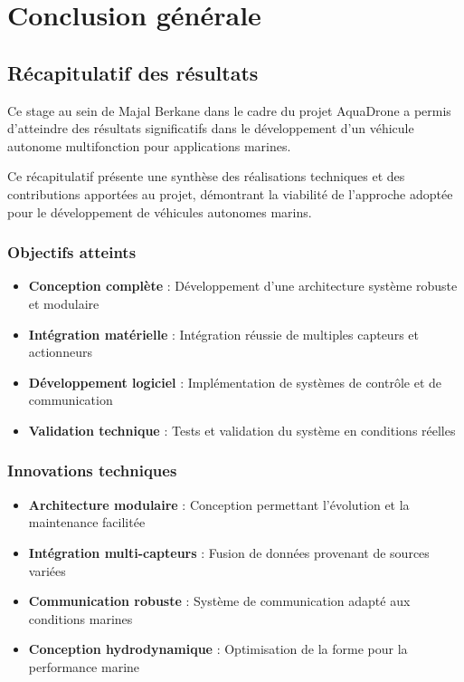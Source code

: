\chapter[Conclusion générale]{Conclusion générale}
\label{cp:conclusion-generale}

{
\parindent0pt

\section{Récapitulatif des résultats}
Ce stage au sein de Majal Berkane dans le cadre du projet AquaDrone a permis d'atteindre des résultats significatifs dans le développement d'un véhicule autonome multifonction pour applications marines.

\begin{block}[tip]
Ce récapitulatif présente une synthèse des réalisations techniques et des contributions apportées au projet, démontrant la viabilité de l'approche adoptée pour le développement de véhicules autonomes marins.
\end{block}

\subsection{Objectifs atteints}
\begin{itemize}
    \item \textbf{Conception complète} : Développement d'une architecture système robuste et modulaire
    \item \textbf{Intégration matérielle} : Intégration réussie de multiples capteurs et actionneurs
    \item \textbf{Développement logiciel} : Implémentation de systèmes de contrôle et de communication
    \item \textbf{Validation technique} : Tests et validation du système en conditions réelles
\end{itemize}

\subsection{Innovations techniques}
\begin{itemize}
    \item \textbf{Architecture modulaire} : Conception permettant l'évolution et la maintenance facilitée
    \item \textbf{Intégration multi-capteurs} : Fusion de données provenant de sources variées
    \item \textbf{Communication robuste} : Système de communication adapté aux conditions marines
    \item \textbf{Conception hydrodynamique} : Optimisation de la forme pour la performance marine
\end{itemize}

}
